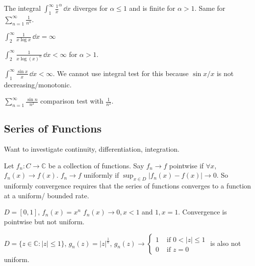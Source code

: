 \documentclass{report}
\begin{document}
\begin{examples}
    \begin{example}
        The integral $\int_{1}^{\infty} \frac{1}{x}^{\alpha} \, \dd{x} $ diverges for $\alpha \leq 1$ and is finite for $\alpha > 1$. Same for $\sum_{n = 1}^{\infty} \frac{1}{n^{\alpha}}$.
    \end{example}
    \begin{example}
        $\int_{2}^{\infty} \frac{1}{x \mathop{log}x} \, \dd{x} = \infty$
    \end{example}
    \begin{example}
        $\int_{2}^{\infty} \frac{1}{x\mathop{log}(x)^{\alpha}} \, \dd{x} < \infty$ for $\alpha > 1$.
    \end{example}
    \begin{example}
        $\int_{1}^{\infty} \frac{\sin{x}}{x} \, \dd{x}  < \infty$. We cannot use integral test for this because $\sin{x}/x$ is not decreasing/monotonic.
    \end{example}
    \begin{example}
        $\sum_{n = 1}^{\infty} \frac{\sin{n}}{n^{2}}$ comparison test with $\frac{1}{n^{2}}$.
    \end{example}
\end{examples}

\begin{topic}
    \section{Series of Functions}
\end{topic}

Want to investigate continuity, differentiation, integration.

\begin{definition}{}
    Let $f_{n} : C \rightarrow \mathbb{C}$ be a collection of functions. Say $f_{n} \rightarrow f$ pointwise if $\forall x$, $f_{n}(x) \rightarrow f(x)$. $f_{n} \rightarrow f$ uniformly if $\sup_{x \in D}\lvert f_{n}(x) - f(x) \rvert \rightarrow 0$. So uniformly convergence requires that the series of functions converges to a function at a uniform/ bounded rate.
\end{definition}

\begin{examples}
    \begin{example}
        $D = [0, 1]$, $f_{n}(x) = x^{n}$ $f_{n}(x) \rightarrow 0, x < 1$ and $1, x = 1$. Convergence is pointwise but not uniform.
    \end{example}
    \begin{example}
        $D = \{z \in \mathbb{C} : \lvert z \rvert \leq 1\}$, $g_{n}(z) = \lvert z \rvert^{\frac{1}{n}}$, $g_{n}(z) \rightarrow \begin{cases}
            1     &\text{ if } 0 < \lvert z \rvert \leq 1 \\
            0 &\text{ if } z = 0   
        \end{cases}$ is also not uniform.
    \end{example} 
\end{examples}
\end{document}
